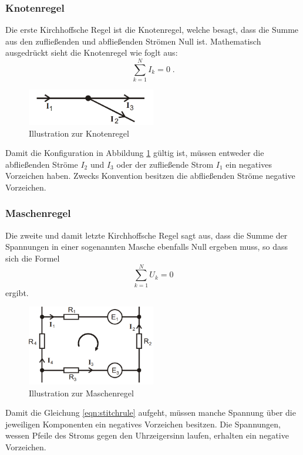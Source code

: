 \subsubsection{Knotenregel}
Die erste Kirchhoffsche Regel ist die Knotenregel, welche besagt, dass die Summe aus den zufließenden und abfließenden Strömen Null ist.
Mathematisch ausgedrückt sieht die Knotenregel wie foglt aus:
\begin{equation}
    \sum_{k=1}^N I_k = 0 \label{eqn:knotrule} \; \text{.}
\end{equation} 
\begin{figure}
    \centering
    \caption{Illustration zur Knotenregel}
    \label{fig:knotrule}
    \includegraphics[width = 0.5\textwidth]{bridges/knotrule.png}
\end{figure}
Damit die Konfiguration in Abbildung \ref{fig:knotrule} gültig ist, müssen entweder die abfließenden Ströme $I_2$ und $I_3$ oder 
der zufließende Strom $I_1$ ein negatives Vorzeichen haben. 
Zwecks Konvention besitzen die abfließenden Ströme negative Vorzeichen.
\subsubsection{Maschenregel}
Die zweite und damit letzte Kirchhoffsche Regel sagt aus, dass die Summe der Spannungen in einer sogenannten Masche ebenfalls Null ergeben muss, so dass sich die Formel
\begin{equation}
    \sum_{k=1}^N U_k = 0 \label{eqn:stitchrule}
\end{equation}
ergibt.
\begin{figure}
    \centering
    \caption{Illustration zur Maschenregel}
    \label{fig:stitchrule}
    \includegraphics[width=0.5\textwidth]{bridges/stitchrule.png}
\end{figure}
Damit die Gleichung \eqref{eqn:stitchrule} aufgeht, müssen manche Spannung über die jeweiligen Komponenten ein negatives Vorzeichen besitzen.
Die Spannungen, wessen Pfeile des Stroms gegen den Uhrzeigersinn laufen, erhalten ein negative Vorzeichen.
